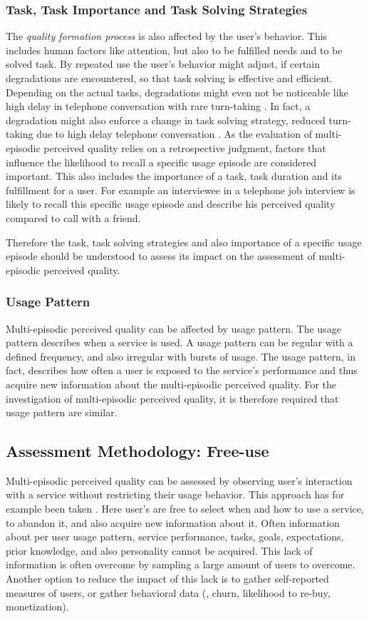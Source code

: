 \subsubsection*{Task, Task Importance and Task Solving Strategies}
The \emph{quality formation process} is also affected by the user's behavior.
This includes human factors like attention, but also to be fulfilled needs and to be solved task.
By repeated use the user's behavior might adjust, if certain degradations are encountered, so that task solving is effective and efficient.
Depending on the actual tasks, degradations might even not be noticeable like high delay in telephone conversation with rare turn-taking \citep[cf.][]{schoenenberg_quality_????}. %
In fact, a degradation might also enforce a change in task solving strategy, \eg reduced turn-taking due to high delay telephone conversation \citep[cf.][]{schoenenberg_quality_????}.
As the evaluation of multi-episodic perceived quality relies on a retrospective judgment, factors that influence the likelihood to recall a specific usage episode are considered important.
This also includes the importance of a task, task duration and its fulfillment for a user.
For example an interviewee in a telephone job interview is likely to recall this specific usage episode and describe his perceived quality compared to call with a friend.

Therefore the task, task solving strategies and also importance of a specific usage episode should be understood to assess its impact on the assessment of multi-episodic perceived quality.

\subsubsection*{Usage Pattern}
Multi-episodic perceived quality can be affected by usage pattern.
The usage pattern describes when a service is used.
A usage pattern can be regular with a defined frequency, and also irregular with bursts of usage.
The usage pattern, in fact, describes how often a user is exposed to the service's performance and thus acquire new information about the multi-episodic perceived quality.
For the investigation of multi-episodic perceived quality, it is therefore required that usage pattern are similar.

\subsection{Assessment Methodology: Free-use}
Multi-episodic perceived quality can be assessed by observing user's interaction with a service without restricting their usage behavior.
This approach has for example been taken \cite{duncanson_average_1969}.
Here user's are free to select when and how to use a service, to abandon it, and also acquire new information about it. %
Often information about per user usage pattern, service performance, tasks, goals, expectations, prior knowledge, and also personality cannot be acquired.
This lack of information is often overcome by sampling a large amount of users to overcome.
Another option to reduce the impact of this lack is to gather self-reported measures of users, or gather behavioral data (\eg, churn, likelihood to re-buy, monetization).

